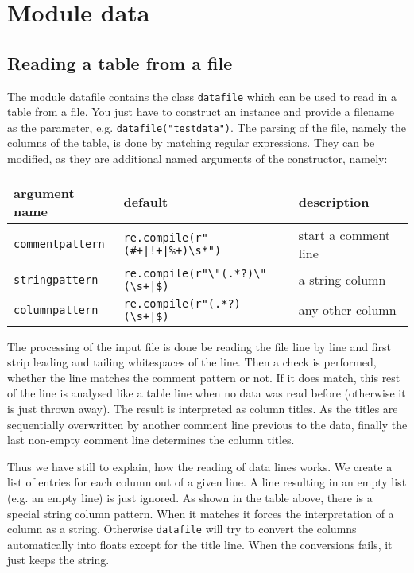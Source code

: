 \chapter{Module data}
\label{datafile}

\section{Reading a table from a file}

The module datafile contains the class \verb|datafile| which can be
used to read in a table from a file. You just have to construct an
instance and provide a filename as the parameter, e.g.
\verb|datafile("testdata")|. The parsing of the file, namely the
columns of the table, is done by matching regular expressions. They
can be modified, as they are additional named arguments of the
constructor, namely:

\medskip
\begin{tabularx}{\linewidth}{ll>{\raggedright\arraybackslash}X}
argument name&default&description\\
\hline
\texttt{commentpattern}&\texttt{re.compile(r"(\#+|!+|\%+)\textbackslash s*")}&start a comment line\\
\texttt{stringpattern}&\texttt{re.compile(r"\textbackslash"(.*?)\textbackslash"(\textbackslash s+|\$)}&a string column\\
\texttt{columnpattern}&\texttt{re.compile(r"(.*?)(\textbackslash s+|\$)}&any other column\\
\end{tabularx}
\medskip

The processing of the input file is done be reading the file line by
line and first strip leading and tailing whitespaces of the line. Then
a check is performed, whether the line matches the comment pattern or
not. If it does match, this rest of the line is analysed like a table
line when no data was read before (otherwise it is just thrown away).
The result is interpreted as column titles. As the titles are
sequentially overwritten by another comment line previous to the data,
finally the last non-empty comment line determines the column titles.

Thus we have still to explain, how the reading of data lines works. We
create a list of entries for each column out of a given line. A line
resulting in an empty list (e.g. an empty line) is just ignored. As
shown in the table above, there is a special string column pattern.
When it matches it forces the interpretation of a column as a string.
Otherwise \verb|datafile| will try to convert the columns
automatically into floats except for the title line. When the
conversions fails, it just keeps the string.

